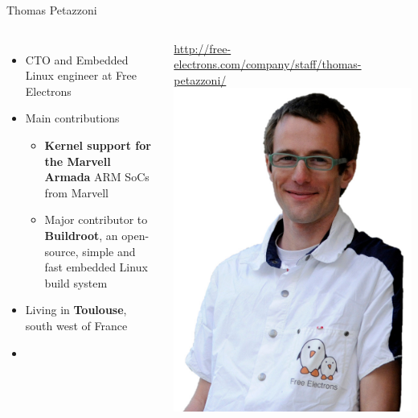 \begin{frame}{Thomas Petazzoni}
 \begin{columns}
  \begin{itemize}
  \item CTO and Embedded Linux engineer at Free Electrons
  \item Main contributions
    \begin{itemize}
    \item {\bf Kernel support for the Marvell Armada} ARM SoCs from
      Marvell
    \item Major contributor to {\bf Buildroot}, an open-source, simple and
      fast embedded Linux build system
    \end{itemize}
  \item Living in {\bf Toulouse}, south west of France
  \item {}
  \end{itemize}
  \url{http://free-electrons.com/company/staff/thomas-petazzoni/}
    \includegraphics[width=\textwidth]{slides/first-slides/thomas-petazzoni.jpg}
 \end{columns}
\end{frame}

